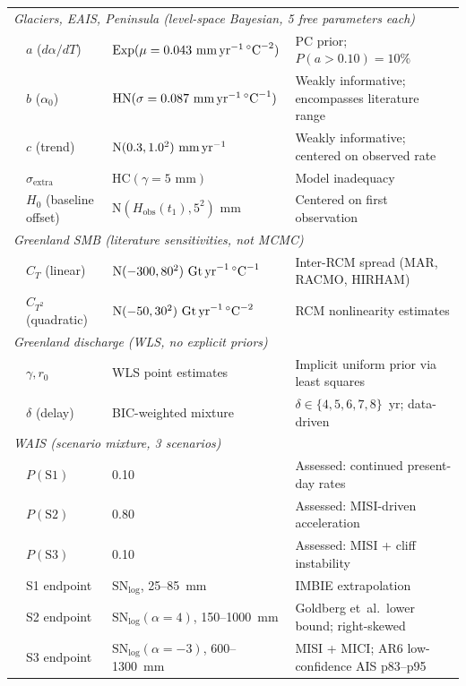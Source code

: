 \documentclass[12pt]{article}
\begin{document}
\begin{landscape}
\begin{longtable}{llll}
\midrule
\multicolumn{4}{l}{\textit{Glaciers, EAIS, Peninsula (level-space Bayesian, 5 free parameters each)}} \\
 & $a$ ($d\alpha/dT$) & $\mathrm{Exp}(\mu = 0.043\text{ mm\,yr}^{-1}\,{}^\circ\text{C}^{-2})$ & PC prior; $P(a > 0.10) = 10\%$ \\
 & $b$ ($\alpha_0$) & $\mathrm{HN}(\sigma = 0.087\text{ mm\,yr}^{-1}\,{}^\circ\text{C}^{-1})$ & Weakly informative; encompasses literature range \\
 & $c$ (trend) & $\mathrm{N}(0.3, 1.0^2)\text{ mm\,yr}^{-1}$ & Weakly informative; centered on observed rate \\
 & $\sigma_\mathrm{extra}$ & $\mathrm{HC}(\gamma = 5\text{ mm})$ & Model inadequacy \\
 & $H_0$ (baseline offset) & $\mathrm{N}(H_\mathrm{obs}(t_1), 5^2)\text{ mm}$ & Centered on first observation \\
\midrule
\multicolumn{4}{l}{\textit{Greenland SMB (literature sensitivities, not MCMC)}} \\
 & $C_T$ (linear) & $\mathrm{N}(-300, 80^2)\text{ Gt\,yr}^{-1}\,{}^\circ\text{C}^{-1}$ & Inter-RCM spread (MAR, RACMO, HIRHAM) \\
 & $C_{T^2}$ (quadratic) & $\mathrm{N}(-50, 30^2)\text{ Gt\,yr}^{-1}\,{}^\circ\text{C}^{-2}$ & RCM nonlinearity estimates \\
\midrule
\multicolumn{4}{l}{\textit{Greenland discharge (WLS, no explicit priors)}} \\
 & $\gamma, r_0$ & WLS point estimates & Implicit uniform prior via least squares \\
 & $\delta$ (delay) & BIC-weighted mixture & $\delta \in \{4,5,6,7,8\}$~yr; data-driven \\
\midrule
\multicolumn{4}{l}{\textit{WAIS (scenario mixture, 3 scenarios)}} \\
 & $P(\mathrm{S1})$ & 0.10 & Assessed: continued present-day rates \\
 & $P(\mathrm{S2})$ & 0.80 & Assessed: MISI-driven acceleration \\
 & $P(\mathrm{S3})$ & 0.10 & Assessed: MISI + cliff instability \\
 & S1 endpoint & $\mathrm{SN}_{\log}$, 25--85~mm & IMBIE extrapolation \\
 & S2 endpoint & $\mathrm{SN}_{\log}(\alpha=4)$, 150--1000~mm & Goldberg et~al.\ lower bound; right-skewed \\
 & S3 endpoint & $\mathrm{SN}_{\log}(\alpha=-3)$, 600--1300~mm & MISI + MICI; AR6 low-confidence AIS p83--p95 \\

\end{longtable}
\end{landscape}
\end{document}
